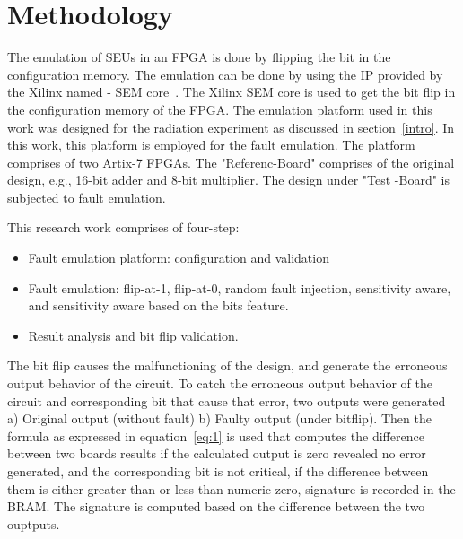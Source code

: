 \section{Methodology}
\label{Methodology}



The emulation of SEUs in an FPGA is done by flipping the bit in the configuration memory. The emulation can be done by using the IP provided by the Xilinx named - SEM core~\cite{xilinx}. The Xilinx SEM core is used to get the bit flip in the configuration memory of the FPGA. The emulation platform used in this work was designed for the radiation experiment as discussed in section~\ref{intro}. In this work, this platform is employed for the fault emulation. The platform comprises of two Artix-7 FPGAs. The "Referenc-Board" comprises of the original design, e.g., 16-bit adder and 8-bit multiplier. The design under "Test -Board" is subjected to fault emulation.  




This research work comprises of four-step:
\begin{itemize}
\item{Fault emulation platform: configuration and validation}
\item{Fault emulation: flip-at-1, flip-at-0, random fault injection, sensitivity aware, and sensitivity aware based on the bits feature}.
\item{Result analysis and bit flip validation}.
\end{itemize}


The bit flip causes the malfunctioning of the design, and generate the erroneous output behavior of the circuit. To catch the erroneous output behavior of the circuit and corresponding bit that cause that error, two outputs were generated a) Original output (without fault) b) Faulty output (under bitflip). Then the formula as expressed in equation~\ref{eq:1} is used that computes the difference between two boards results if the calculated output is zero revealed no error generated, and the corresponding bit is not critical, if the difference between them is either greater than or less than numeric zero, signature is recorded in the BRAM. The signature is computed based on the difference between the two ouptputs.

